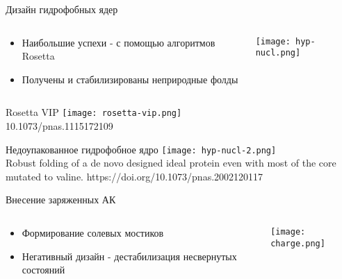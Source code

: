 \begin{frame}{Дизайн гидрофобных ядер}
    \begin{columns}
\begin{column}{0.5\textwidth}
    \begin{itemize}
        \item Наибольшие успехи - с помощью алгоритмов Rosetta
        \item Получены и стабилизированы неприродные фолды
    \end{itemize}
\end{column}
\begin{column}{0.5\textwidth}
    \texttt{[image: hyp-nucl.png]}
\end{column}
\end{columns}
\end{frame}


\begin{frame}{Rosetta VIP}
    \centering
    \texttt{[image: rosetta-vip.png]}\\
10.1073/pnas.1115172109 
\end{frame}

\begin{frame}{Недоупакованное гидрофобное ядро}
    \centering
    \texttt{[image: hyp-nucl-2.png]}\\
    Robust folding of a de novo designed ideal protein even with most of the core mutated to valine.  https://doi.org/10.1073/pnas.2002120117
\end{frame}



\begin{frame}{Внесение заряженных АК}
    \begin{columns}
\begin{column}{0.5\textwidth}
    \begin{itemize}
        \item Формирование солевых мостиков
        \item Негативный дизайн - дестабилизация несвернутых состояний
    \end{itemize}
\end{column}
\begin{column}{0.5\textwidth}
    \texttt{[image: charge.png]}
\end{column}
\end{columns}
\end{frame}



